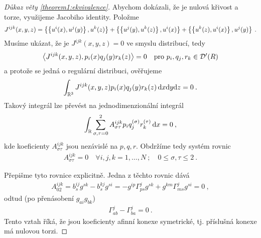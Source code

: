 \begin{proof}[Důkaz věty \ref{theorem1:ekvivalence}]
    Abychom dokázali, že je nulová křivost a torze, využijeme Jacobiho identity. Položme
    \begin{align}
        J^{ijk}(x,y,z) = \left \lbrace  \left \lbrace u^i(x),u^j(y) \right \rbrace, u^k(z)  \right \rbrace + \left \lbrace  \left \lbrace u^j(y), u^k(z) \right \rbrace, u^i(x) \right \rbrace + \left \lbrace  \left \lbrace u^k(z), u^i(x) \right \rbrace, u^j(y) \right \rbrace \:.
    \end{align}
    Musíme ukázat, že je $J^{ijk}(x,y,z) = 0$ ve smyslu distribucí, tedy
    \begin{align}
        \left \langle J^{ijk}(x,y,z) ,p_i(x)q_j(y)r_k(z) \right \rangle = 0 \quad \text{pro } p_i, q_j, r_k \in \mathcal{D'}(R)
    \end{align}
    a protože se jedná o regulární distribuci, ověřujeme
    \begin{align}
        \int_{\mathbb{R}^{3}} J^{ijk}(x,y,z) p_i(x)q_j(y)r_k(z) \, \mathrm{d} x \mathrm{d} y \mathrm{d} z = 0\:.
    \end{align}
    Takový integrál lze převést na jednodimenzionální integrál
    \begin{align}
        \int_{\mathbb{R}} \sum_{\sigma, \tau =0}^2 A^{ijk}_{\sigma \tau} p_i q_j^{(\sigma)} r_k^{(\tau)} \, \mathrm{d} x = 0 \:,
    \end{align}
    kde koeficienty $A^{ijk}_{\sigma \tau}$ jsou nezávislé na $p,q,r$.
    Obdržíme tedy systém rovnic \begin{align}
        A^{ijk}_{\sigma \tau} = 0 \quad \forall i,j,k=1, \dots ,N \:; \quad 0 \leq \sigma, \tau \leq 2 \:.
    \end{align}

    Přepišme tyto rovnice explicitně. 
    Jedna z těchto rovnic dává
    \begin{align}
        A_{02}^{ijk} = b^{ij}_s g^{sk} - b^{kj}_s g^{si} = -g^{ip} \Gamma^{j}_{ps} g^{sk} + g^{km} \Gamma^{j}_{ms} g^{si} =0 \:,
    \end{align}
    odtud (po přenásobení $g_{ai}g_{bk}$)
    \begin{align}
        \Gamma^j_{ab} - \Gamma^j_{ba} = 0 \:.
    \end{align}
    Tento vztah říká, že jsou koeficienty afinní konexe symetrické, tj. příslušná konexe má nulovou torzi.


\end{proof}

